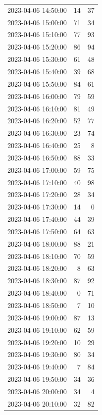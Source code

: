 \documentclass[
  letterpaper,
  DIV=11,
  numbers=noendperiod]{scrartcl}
\begin{document}
\begin{tabular}{lrr}
2023-04-06 14:50:00 &    14 &    37 \\
2023-04-06 15:00:00 &    71 &    34 \\
2023-04-06 15:10:00 &    77 &    93 \\
2023-04-06 15:20:00 &    86 &    94 \\
2023-04-06 15:30:00 &    61 &    48 \\
2023-04-06 15:40:00 &    39 &    68 \\
2023-04-06 15:50:00 &    84 &    61 \\
2023-04-06 16:00:00 &    79 &    59 \\
2023-04-06 16:10:00 &    81 &    49 \\
2023-04-06 16:20:00 &    52 &    77 \\
2023-04-06 16:30:00 &    23 &    74 \\
2023-04-06 16:40:00 &    25 &     8 \\
2023-04-06 16:50:00 &    88 &    33 \\
2023-04-06 17:00:00 &    59 &    75 \\
2023-04-06 17:10:00 &    40 &    98 \\
2023-04-06 17:20:00 &    28 &    34 \\
2023-04-06 17:30:00 &    14 &     0 \\
2023-04-06 17:40:00 &    44 &    39 \\
2023-04-06 17:50:00 &    64 &    63 \\
2023-04-06 18:00:00 &    88 &    21 \\
2023-04-06 18:10:00 &    70 &    59 \\
2023-04-06 18:20:00 &     8 &    63 \\
2023-04-06 18:30:00 &    87 &    92 \\
2023-04-06 18:40:00 &     0 &    71 \\
2023-04-06 18:50:00 &     7 &    10 \\
2023-04-06 19:00:00 &    87 &    13 \\
2023-04-06 19:10:00 &    62 &    59 \\
2023-04-06 19:20:00 &    10 &    29 \\
2023-04-06 19:30:00 &    80 &    34 \\
2023-04-06 19:40:00 &     7 &    84 \\
2023-04-06 19:50:00 &    34 &    36 \\
2023-04-06 20:00:00 &    34 &     4 \\
2023-04-06 20:10:00 &    32 &    82 \\

\end{tabular}
\end{document}
